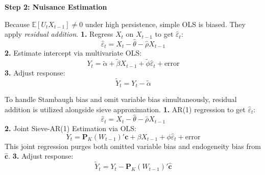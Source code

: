 \documentclass[11pt,landscape]{article}
\begin{document}
\vspace{1em}
\noindent\hrulefill
\vspace{1em}

\noindent\textbf{\large Step 2: Nuisance Estimation} \vspace{0.5em}

\noindent
\begin{minipage}[t]{0.48\textwidth}
Because $\mathbb{E}[U_t X_{t-1}] \neq 0$ under high persistence, simple OLS is biased. They apply \textit{residual addition}. \newline
\textbf{1.} Regress $X_t$ on $X_{t-1}$ to get $\widehat{\varepsilon}_t$:
\begin{equation}
    \widehat{\varepsilon}_t = X_t - \widehat{\theta} - \widehat{\rho} X_{t-1}
\end{equation}
\textbf{2.} Estimate intercept via multivariate OLS:
\begin{equation}
    Y_t = \widetilde{\alpha} + \widetilde{\beta} X_{t-1} + \widetilde{\phi} \widehat{\varepsilon}_t + \text{error}
\end{equation}
\textbf{3.} Adjust response:
\begin{equation}
    \widetilde{Y}_t = Y_t - \widetilde{\alpha}
\end{equation}
\end{minipage}%
\hfill
\begin{minipage}[t]{0.48\textwidth}
To handle Stambaugh bias and omit variable bias simultaneously, residual addition is utilized alongside sieve approximation. \newline
\textbf{1.} AR(1) regression to get $\widehat{\varepsilon}_t$:
\begin{equation}
    \widehat{\varepsilon}_t = X_t - \widehat{\theta} - \widehat{\rho} X_{t-1}
\end{equation}
\textbf{2.} Joint Sieve-AR(1) Estimation via OLS:
\begin{equation}
    Y_t = \bm{P}_K(W_{t-1})'\bm{c} + \beta X_{t-1} + \phi \widehat{\varepsilon}_t + \text{error}
\end{equation}
This joint regression purges both omitted variable bias and endogeneity bias from $\widehat{\bm{c}}$. \newline
\textbf{3.} Adjust response:
\begin{equation}
    \widetilde{Y}_t = Y_t - \bm{P}_K(W_{t-1})'\widehat{\bm{c}}
\end{equation}
\end{minipage}
\end{document}
